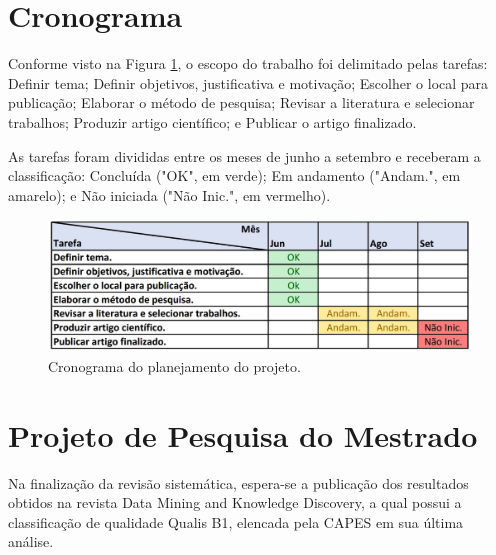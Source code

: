 \documentclass[smallextended]{svjour3}       %
\begin{document}
\section{Cronograma}
\label{sec:4}

Conforme visto na Figura \ref{fig:cronograma}, o escopo do trabalho foi delimitado pelas tarefas: Definir tema; Definir objetivos, justificativa e motivação; Escolher o local para publicação; Elaborar o método de pesquisa; Revisar a literatura e selecionar trabalhos; Produzir artigo científico; e Publicar o artigo finalizado. 

As tarefas foram divididas entre os meses de junho a setembro e receberam a classificação: Concluída ("OK", em verde); Em andamento ("Andam.", em amarelo); e Não iniciada ("Não Inic.", em vermelho). 

\begin{figure}[!ht]
	\centering
	\includegraphics[width=1\textwidth]{imagens/cronograma2.jpg}
	\caption{Cronograma do planejamento do projeto.}
	\label{fig:cronograma}
\end{figure}
	
\section{Projeto de Pesquisa do Mestrado}
\label{sec:5}

Na finalização da revisão sistemática, espera-se a publicação dos resultados obtidos na revista Data Mining and Knowledge Discovery, a qual possui a classificação de qualidade Qualis B1, elencada pela CAPES em sua última análise. 

	
\end{document}
